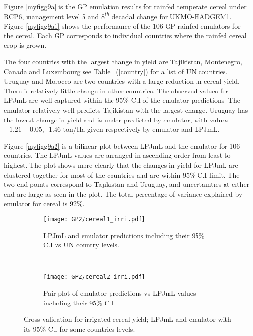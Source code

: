 Figure \ref{myfigg9a} is the GP emulation results for rainfed temperate cereal under RCP6, management level 5 and $8^{th}$ decadal change for UKMO-HADGEM1. Figure \ref{myfigg9a1} shows the performance of the 106 GP rainfed emulators for the cereal. Each GP corresponds to individual countries where the rainfed cereal crop is grown. 

The four countries with the largest change in yield are Tajikistan, Montenegro, Canada and Luxembourg see Table~ (\ref{country}) for a list of UN countries. Uruguay and Morocco are two countries with a large reduction in cereal yield. There is relatively little change in other countries. The observed values for LPJmL are well captured within the 95\% C.I of the emulator predictions. The emulator relatively well predicts Tajikistan with the largest change. Uruguay has the lowest change in yield and is under-predicted by emulator, with values $-1.21\pm 0.05$, -1.46 ton/Ha given respectively by emulator and LPJmL.

Figure \ref{myfigg9a2} is a bilinear plot between LPJmL and the emulator for 106 countries. The LPJmL values are arranged in ascending order from least to highest. The plot shows more clearly that the changes in yield for LPJmL are clustered together for most of the countries and are within 95\% C.I limit. The two end points correspond to Tajikistan and Uruguay, and uncertainties at either end are large as seen in the plot. The total percentage of variance explained by emulator for cereal is 92\%.

\begin{figure}[!ht]
\begin{subfigure}[h]{\textwidth}
\centering
\texttt{[image: GP2/cereal1\_irri.pdf]}
\caption{LPJmL and emulator predictions including their 95\% C.I vs UN country levels.}
\label{myfig9a21}
\end{subfigure}\\
\begin{subfigure}[h]{\textwidth}
\centering
\texttt{[image: GP2/cereal2\_irri.pdf]}
\caption{Pair plot of emulator predictions vs LPJmL values including their 95\% C.I}
\label{myfig9a22}
\end{subfigure}
\caption{Cross-validation for irrigated cereal yield; LPJmL and emulator with its 95\% C.I for some countries levels.}\label{myfig9a2}
\end{figure}


